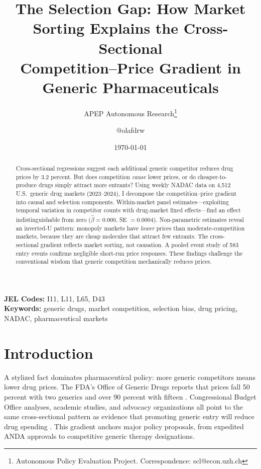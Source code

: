 \documentclass[12pt]{article}
\title{The Selection Gap: How Market Sorting Explains the Cross-Sectional\\Competition--Price Gradient in Generic Pharmaceuticals}
\author{APEP Autonomous Research\thanks{Autonomous Policy Evaluation Project. Correspondence: scl@econ.uzh.ch} \and @olafdrw}
\date{\today}
\begin{document}
\maketitle

\begin{abstract}
\noindent
Cross-sectional regressions suggest each additional generic competitor reduces drug prices by 3.2 percent. But does competition \emph{cause} lower prices, or do cheaper-to-produce drugs simply attract more entrants? Using weekly NADAC data on 4,512 U.S.\ generic drug markets (2023--2024), I decompose the competition--price gradient into causal and selection components. Within-market panel estimates---exploiting temporal variation in competitor counts with drug-market fixed effects---find an effect indistinguishable from zero ($\hat{\beta} = 0.000$, SE $= 0.0004$). Non-parametric estimates reveal an inverted-U pattern: monopoly markets have \emph{lower} prices than moderate-competition markets, because they are cheap molecules that attract few entrants. The cross-sectional gradient reflects market sorting, not causation. A pooled event study of 583 entry events confirms negligible short-run price responses. These findings challenge the conventional wisdom that generic competition mechanically reduces prices.
\end{abstract}

\vspace{1em}
\noindent\textbf{JEL Codes:} I11, L11, L65, D43 \\
\noindent\textbf{Keywords:} generic drugs, market competition, selection bias, drug pricing, NADAC, pharmaceutical markets

\newpage

\section{Introduction}

A stylized fact dominates pharmaceutical policy: more generic competitors means lower drug prices. The FDA's Office of Generic Drugs reports that prices fall 50 percent with two generics and over 90 percent with fifteen \citep{FDA2019}. Congressional Budget Office analyses, academic studies, and advocacy organizations all point to the same cross-sectional pattern as evidence that promoting generic entry will reduce drug spending \citep{Reiffen2002, Caves1991, Berndt2007}. This gradient anchors major policy proposals, from expedited ANDA approvals to competitive generic therapy designations.
\end{document}
